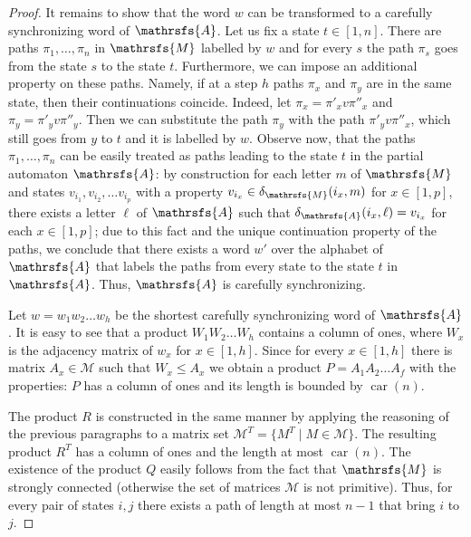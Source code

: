 \documentclass[a4paper,USenglish]{lipics}
\DeclareMathOperator{\car}{car}
\theoremstyle{definition}
\begin{document}
\begin{proof}
It remains to show that the word $w$ can be transformed to a carefully synchronizing word of $\mathrsfs{A}$. Let us fix a state $t \in [1,n]$. There are paths $\pi_1, \ldots, \pi_n$ in $\mathrsfs{M}$ labelled by $w$ and for every $s$ the path $\pi_s$ goes from the state $s$ to the state $t$. Furthermore, we can impose an additional property on these paths. Namely, if at a step $h$ paths $\pi_x$ and $\pi_y$ are in the same state, then their continuations coincide. Indeed, let $\pi_x = \pi'_x v \pi''_x$ and $\pi_y = \pi'_y v \pi''_y$. Then we can substitute the path $\pi_y$ with the path $\pi'_y v \pi''_x$, which still goes from $y$ to $t$ and it is labelled by $w$.
Observe now, that the paths $\pi_1, \ldots, \pi_n$ can be easily treated as paths leading to the state $t$ in the partial automaton $\mathrsfs{A}$: by construction for each letter $m$ of $\mathrsfs{M}$ and states $v_{i_1}, v_{i_2}, \ldots v_{i_p}$ with a property $v_{i_x} \in \delta_{\mathrsfs{M}}(i_x, m)$ for $x \in [1,p]$, there exists a letter $\ell$ of $\mathrsfs{A}$ such that $\delta_{\mathrsfs{A}}(i_x, \ell) = v_{i_x}$ for each $x \in [1,p]$; due to this fact and the unique continuation property of the paths, we conclude that there exists a word $w'$ over the alphabet of $\mathrsfs{A}$ that labels the paths from every state to the state $t$ in $\mathrsfs{A}$. Thus, $\mathrsfs{A}$ is carefully synchronizing.


Let $w=w_1w_2 \ldots w_h$ be the shortest carefully synchronizing word of $\mathrsfs{A}$. It is easy to see that a product $W_1W_2 \ldots W_h$ contains a column of ones, where $W_x$ is the adjacency matrix of $w_x$ for $x \in [1,h]$. Since for every $x\in [1,h]$ there is matrix $A_x \in \mathcal{M}$ such that $W_x \leq A_x$ we obtain a product $P=A_1A_2 \ldots A_f$ with the properties: $P$ has a column of ones and its length is bounded by $\car (n)$.

The product $R$ is constructed in the same manner by applying the reasoning of the previous paragraphs to a matrix set $\mathcal{M}^T = \{ M^T \mid M \in \mathcal{M}\}$. The resulting product $R^T$ has a column of ones and the length at most $\car (n)$. The existence of the product $Q$ easily follows from the fact that $\mathrsfs{M}$ is strongly connected (otherwise the set of matrices $\mathcal{M}$ is not primitive). Thus, for every pair of states $i,j$ there exists a path of length at most $n-1$ that bring $i$ to $j$.



\end{proof}
\end{document}
